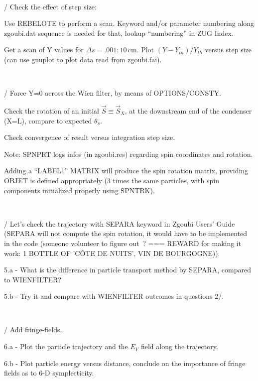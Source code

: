 ~

/ Check the effect of step size:

Use REBELOTE to perform a scan. Keyword and/or parameter numbering along zgoubi.dat sequence is needed for that, lookup ``numbering'' in ZUG Index.

Get a scan of Y values for $ \Delta s = .001:10$\,cm.
   Plot $(Y-Y_{th})/Y_{th}$ versus step size (can use gnuplot to plot data read from zgoubi.fai).

   ~

   /
   Force Y=0 across the Wien filter, by means of OPTIONS/CONSTY.

   Check the rotation of an initial $\vec S \equiv \vec S_X$, at the downstream end of the condenser (X=L), compare to expected $\theta_s$. 

Check convergence of result versus integration step size. 

\medskip

\nin Note: SPNPRT logs infos (in zgoubi.res) regarding spin coordinates and rotation.

Adding a ``LABEL1''  MATRIX will produce the spin rotation matrix, providing OBJET is defined appropriately (3 times the same particles, with spin components initialized properly using SPNTRK).


   ~

   / Let's check the trajectory with SEPARA keyword in Zgoubi Users' Guide (SEPARA will not compute the spin rotation, it would have to be implemented in the code (someone volunteer to figure out~? === REWARD for making it work: 1 BOTTLE OF 'C\^OTE DE NUITS', VIN DE BOURGOGNE)).

5.a - What is the difference in particle transport method by SEPARA, compared to WIENFILTER?

5.b - Try it and compare with WIENFILTER outcomes in questions 2/.

   ~

   / Add fringe-fields.

   6.a -  Plot the particle trajectory and the $E_Y$  field along the trajectory.
   
   6.b - Plot particle energy versus distance, conclude on the importance of fringe fields as to 6-D symplecticity. 


  
